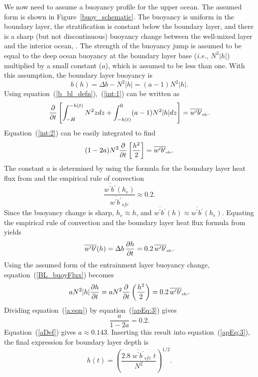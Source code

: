 \documentclass[preprint,12pt,authoryear]{agujournal}
\begin{document}
We now need to assume a buoyancy profile for the upper ocean.  The assumed form is shown in Figure~\ref{buoy_schematic}.  The buoyancy is uniform in the boundary layer, the stratification is constant below the boundary layer, and there is a sharp (but not discontinuous) buoyancy change between the well-mixed layer and the interior ocean, \citep[similar to][]{VanZanten1999}.  The strength of the buoyancy jump is assumed to be equal to the deep ocean buoyancy at the boundary layer base (\textit{i.e.}, $N^2 |h|$) multiplied by a small constant ($a$), which is assumed to be less than one.  With this assumption, the boundary layer buoyancy is 
\begin{equation}
\label{b_bl_defn}
b(h) = \Delta b - N^2 |h|= (a - 1) N^2 |h|.
\end{equation}
Using equation~(\ref{b_bl_defn}),~(\ref{int:1}) can be written as
\begin{equation}
\label{int:2}
\frac{\partial}{\partial t} \left[\int_{-H}^{-h(t)} N^2 z dz + \int_{-h(t)}^0 (a-1)N^2 |h| dz \right] = \overline{w^\prime b^\prime}_{\mbox{\tiny sfc}}.
\end{equation}
Equation~(\ref{int:2}) can be easily integrated to find
\begin{equation}
\label{apEq:3}
(1-2a)N^2\frac{\partial}{\partial t}\left[\frac{h^2}{2}\right]=\overline{w^\prime b^\prime}_{\mbox{\tiny sfc}}.
\end{equation}
The constant $a$ is determined by using the formula for the boundary layer heat flux from \cite{Lilly1968} and the empirical rule of convection 
\begin{equation}
 \frac{ \overline{w^\prime b^\prime}(h_e)}{\overline{w^\prime b^\prime}_{sfc}}  \approx 0.2.
\end{equation}
 Since the buoyancy change is sharp, $h_e\approx h$, and $\overline{w^\prime b^\prime}(h) \approx \overline{w^\prime b^\prime}(h_e)$.  Equating the empirical rule of convection and the boundary layer heat flux formula from \citet{Lilly1968} yields
\begin{equation}
\overline{w^\prime b^\prime}(h) = \Delta b \, \frac{\partial h}{\partial t} = 0.2 \, \overline{w^\prime b^\prime}_{\mbox{\tiny sfc}}.
\label{BL_buoyFlux}
\end{equation}
Using the assumed form of the entrainment layer buoyancy change, equation~(\ref{BL_buoyFlux}) becomes
\begin{equation}
\label{a:eqn}
a N^2 |h| \frac{\partial h}{\partial t} = a N^2 \frac{\partial}{\partial t}\left(\frac{h^2}{2}\right) = 0.2 \, \overline{w^\prime b^\prime}_{\mbox{\tiny sfc}}.
\end{equation}
Dividing equation~(\ref{a:eqn}) by equation~(\ref{apEq:3}) gives
\begin{equation}
\frac{a}{1-2a} = 0.2.
\label{aDef}
\end{equation}
Equation~(\ref{aDef}) gives $a\approx0.143$.  Inserting this result into equation~(\ref{apEq:3}), the final expression for boundary layer depth is
\begin{equation}
\label{finalH}
h(t) = \left(\frac{2.8 \; \overline{w^\prime b^\prime}_{sfc} \; t}{N^2}\right)^{1/2}.
\end{equation}

\clearpage



\end{document}
